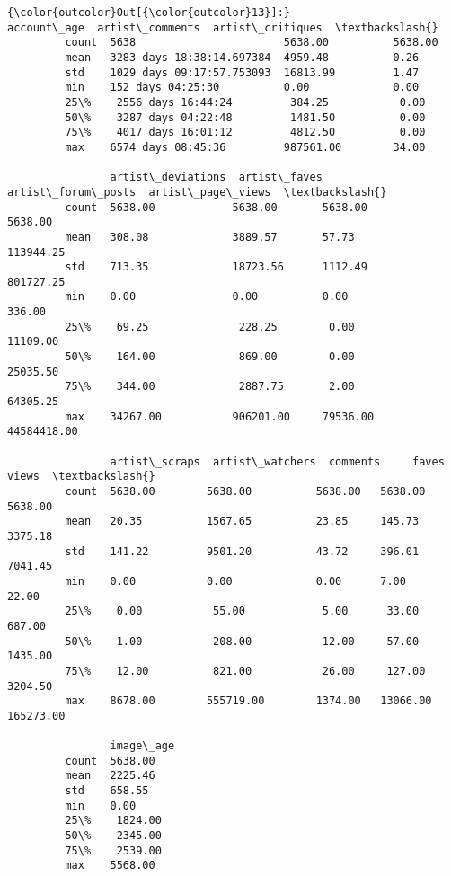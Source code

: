 \documentclass[11pt]{article}
\begin{document}
\begin{Verbatim}[commandchars=\\\{\}]
{\color{outcolor}Out[{\color{outcolor}13}]:}                      account\_age  artist\_comments  artist\_critiques  \textbackslash{}
         count  5638                       5638.00          5638.00            
         mean   3283 days 18:38:14.697384  4959.48          0.26               
         std    1029 days 09:17:57.753093  16813.99         1.47               
         min    152 days 04:25:30          0.00             0.00               
         25\%    2556 days 16:44:24         384.25           0.00               
         50\%    3287 days 04:22:48         1481.50          0.00               
         75\%    4017 days 16:01:12         4812.50          0.00               
         max    6574 days 08:45:36         987561.00        34.00              
         
                artist\_deviations  artist\_faves  artist\_forum\_posts  artist\_page\_views  \textbackslash{}
         count  5638.00            5638.00       5638.00             5638.00             
         mean   308.08             3889.57       57.73               113944.25           
         std    713.35             18723.56      1112.49             801727.25           
         min    0.00               0.00          0.00                336.00              
         25\%    69.25              228.25        0.00                11109.00            
         50\%    164.00             869.00        0.00                25035.50            
         75\%    344.00             2887.75       2.00                64305.25            
         max    34267.00           906201.00     79536.00            44584418.00         
         
                artist\_scraps  artist\_watchers  comments     faves      views  \textbackslash{}
         count  5638.00        5638.00          5638.00   5638.00   5638.00     
         mean   20.35          1567.65          23.85     145.73    3375.18     
         std    141.22         9501.20          43.72     396.01    7041.45     
         min    0.00           0.00             0.00      7.00      22.00       
         25\%    0.00           55.00            5.00      33.00     687.00      
         50\%    1.00           208.00           12.00     57.00     1435.00     
         75\%    12.00          821.00           26.00     127.00    3204.50     
         max    8678.00        555719.00        1374.00   13066.00  165273.00   
         
                image\_age  
         count  5638.00    
         mean   2225.46    
         std    658.55     
         min    0.00       
         25\%    1824.00    
         50\%    2345.00    
         75\%    2539.00    
         max    5568.00    
\end{Verbatim}
\end{document}

